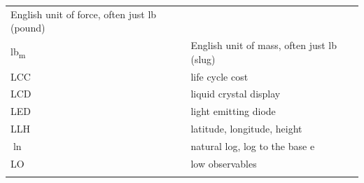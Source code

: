 \documentclass[
]{book}
\begin{document}
\begin{longtable}[]{@{}ll@{}}
\begin{minipage}[t]{0.47\columnwidth}
English unit of force, often just lb (pound)\strut
\end{minipage}\tabularnewline
\begin{minipage}[t]{0.47\columnwidth}\raggedright
lb\textsubscript{m}\strut
\end{minipage} & \begin{minipage}[t]{0.47\columnwidth}\raggedright
English unit of mass, often just lb (slug)\strut
\end{minipage}\tabularnewline
\begin{minipage}[t]{0.47\columnwidth}\raggedright
LCC\strut
\end{minipage} & \begin{minipage}[t]{0.47\columnwidth}\raggedright
life cycle cost\strut
\end{minipage}\tabularnewline
\begin{minipage}[t]{0.47\columnwidth}\raggedright
LCD\strut
\end{minipage} & \begin{minipage}[t]{0.47\columnwidth}\raggedright
liquid crystal display\strut
\end{minipage}\tabularnewline
\begin{minipage}[t]{0.47\columnwidth}\raggedright
LED\strut
\end{minipage} & \begin{minipage}[t]{0.47\columnwidth}\raggedright
light emitting diode\strut
\end{minipage}\tabularnewline
\begin{minipage}[t]{0.47\columnwidth}\raggedright
LLH\strut
\end{minipage} & \begin{minipage}[t]{0.47\columnwidth}\raggedright
latitude, longitude, height\strut
\end{minipage}\tabularnewline
\begin{minipage}[t]{0.47\columnwidth}\raggedright
\(\ln\)\strut
\end{minipage} & \begin{minipage}[t]{0.47\columnwidth}\raggedright
natural log, log to the base \(\mathrm{e}\)\strut
\end{minipage}\tabularnewline
\begin{minipage}[t]{0.47\columnwidth}\raggedright
LO\strut
\end{minipage} & \begin{minipage}[t]{0.47\columnwidth}\raggedright
low observables\strut
\end{minipage}\tabularnewline
\begin{minipage}[t]{0.47\columnwidth}\raggedright

\end{minipage}
\end{longtable}
\end{document}
